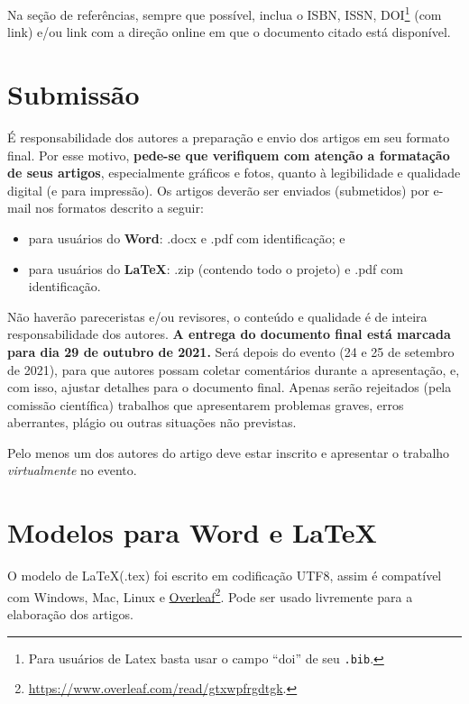 Na seção de referências, sempre que possível, inclua o ISBN, ISSN, DOI\footnote{Para usuários de Latex basta usar o campo ``doi'' de seu \texttt{.bib}.} (com link) e/ou link com a direção online em que o documento citado está disponível.

\section{Submissão}

É responsabilidade dos autores a preparação e envio dos artigos em seu formato final. Por esse motivo, \textbf{pede-se que verifiquem com atenção a formatação de seus artigos}, especialmente gráficos e fotos, quanto à legibilidade e qualidade digital (e para impressão). Os artigos deverão ser enviados (submetidos) por e-mail nos formatos descrito a seguir:
%
%
\begin{itemize}[noitemsep,topsep=0ex] \itemsep=5pt
	\item para usuários do \textbf{Word}: .docx e .pdf com identificação; e
	\item para usuários do \textbf{\LaTeX}\xspace: .zip (contendo todo o projeto) e .pdf com identificação.
\end{itemize}

Não haverão pareceristas e/ou revisores, o conteúdo e qualidade é de inteira responsabilidade dos autores.
%
\textbf{A entrega do documento final está marcada para dia 29 de outubro de 2021.}
%
 Será depois do evento (24 e 25 de setembro de 2021), para que autores possam coletar comentários durante a apresentação, e, com isso, ajustar detalhes para o documento final. Apenas serão rejeitados (pela comissão científica) trabalhos que apresentarem problemas graves, erros aberrantes, plágio ou outras situações não previstas.

Pelo menos um dos autores do artigo deve estar inscrito e apresentar o trabalho \textit{virtualmente} no evento.

\section{Modelos para Word e \LaTeX}
O modelo de \LaTeX\xspace (.tex) foi escrito em codificação UTF8, assim é compatível com Windows, Mac, Linux e \href{https://www.overleaf.com/read/gtxwpfrgdtgk}{Overleaf}\footnote{\url{https://www.overleaf.com/read/gtxwpfrgdtgk}.}. Pode ser usado livremente para a elaboração dos artigos.
%

